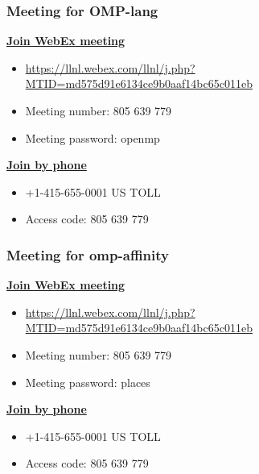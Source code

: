 \begin{frame}[label=omp_lang]
\frametitle{Meeting for OMP-lang} 

\underline{\bf Join WebEx meeting} 
\begin{itemize} 
\small \item \small  \url{https://llnl.webex.com/llnl/j.php?MTID=md575d91e6134ce9b0aaf14bc65c011eb}
\item \small Meeting number: 805 639 779
\item \small Meeting password: openmp
\end{itemize} 

\underline{\bf Join by phone} 
\begin{itemize} 
\small \item \small +1-415-655-0001 US TOLL
\item \small Access code: 805 639 779
\end{itemize} 

\end{frame} 


\begin{frame}[label=omp_affinity]
\frametitle{ Meeting for omp-affinity} 
\underline{\bf Join WebEx meeting} 
\begin{itemize} 
\small \item \small  \url{https://llnl.webex.com/llnl/j.php?MTID=md575d91e6134ce9b0aaf14bc65c011eb}
\item \small Meeting number: 805 639 779
\item \small Meeting password: places
\end{itemize} 

\underline{\bf Join by phone} 
\begin{itemize} 
\item +1-415-655-0001 US TOLL
\item Access code: 805 639 779
\end{itemize} 
\end{frame}

